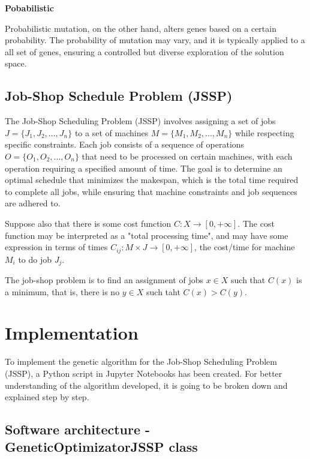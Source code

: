 \documentclass[11pt, a4paper]{article}
\begin{document}
\vspace{1em}\textbf{Pobabilistic}

Probabilistic mutation, on the other hand, alters genes based on a certain probability. The probability of mutation may vary, and it is typically applied to a 
all set of genes, ensuring a controlled but diverse exploration of the solution space.

\subsection{Job-Shop Schedule Problem (JSSP)}

The Job-Shop Scheduling Problem (JSSP) involves assigning a set of jobs \(J = \{J_{1}, J_{2}, ..., J_{n}\}\) to a set of machines \(M = \{M_{1}, M_{2}, ..., M_{n}\}\) 
while respecting specific constraints. Each job consists of a sequence of operations \(O= \{O_{1}, O_{2}, ..., O_{n}\}\) that need to be processed on certain machines, 
with each operation requiring a specified amount of time. The goal is to determine an optimal schedule that minimizes the makespan, which is the total time required to 
complete all jobs, while ensuring that machine constraints and job sequences are adhered to.

\vspace{1em} Suppose also that there is some cost function \(C:X \rightarrow [0,+\infty ]\). The cost function may be interpreted as a "total processing time", and may 
have some expression in terms of times \(C_{ij}:M \times J \rightarrow [0,+\infty ]\), the cost/time for machine \(M_{i}\) to do job \(J_{j}\).

\vspace{1em} The job-shop problem is to find an assignment of jobs \(x \in X\) such that \(C(x)\) is a minimum, that is, there is no \(y \in X\) such taht \(C(x) > C(y) \).

\section{Implementation}

To implement the genetic algorithm for the Job-Shop Scheduling Problem (JSSP), a Python script in Jupyter Notebooks has been created. For better understanding of the algorithm 
developed, it is going to be broken down and explained step by step.


\subsection{Software architecture - GeneticOptimizatorJSSP class}
\end{document}
